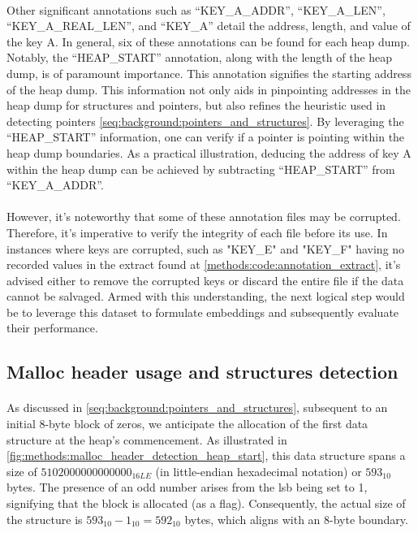         \paragraph{}Other significant annotations such as ``KEY\_A\_ADDR'', ``KEY\_A\_LEN'', ``KEY\_A\_REAL\_LEN'', and ``KEY\_A'' detail the address, length, and value of the key A. In general, six of these annotations can be found for each heap dump. Notably, the ``HEAP\_START'' annotation, along with the length of the heap dump, is of paramount importance. This annotation signifies the starting address of the heap dump. This information not only aids in pinpointing addresses in the heap dump for \glspl{structure} and \glspl{pointer}, but also refines the heuristic used in detecting \glspl{pointer} \ref{seq:background:pointers_and_structures}. By leveraging the ``HEAP\_START'' information, one can verify if a \gls{pointer} is pointing within the heap dump boundaries. As a practical illustration, deducing the address of key A within the heap dump can be achieved by subtracting ``HEAP\_START'' from ``KEY\_A\_ADDR''.

        \paragraph{}However, it's noteworthy that some of these annotation files may be corrupted. Therefore, it's imperative to verify the integrity of each file before its use. In instances where keys are corrupted, such as "KEY\_E" and "KEY\_F" having no recorded values in the extract found at \ref{methods:code:annotation_extract}, it's advised either to remove the corrupted keys or discard the entire file if the data cannot be salvaged. Armed with this understanding, the next logical step would be to leverage this dataset to formulate embeddings and subsequently evaluate their performance.

    \subsection{Malloc header usage and structures detection}
        \paragraph{}As discussed in \ref{seq:background:pointers_and_structures}, subsequent to an initial 8-byte block of zeros, we anticipate the allocation of the first data structure at the heap's commencement. As illustrated in \ref{fig:methods:malloc_header_detection_heap_start}, this data structure spans a size of $ 5102000000000000_{16LE} $ (in little-endian hexadecimal notation) or $ 593_{10} $ bytes. The presence of an odd number arises from the \acrshort{lsb} being set to 1, signifying that the block is allocated (as a flag). Consequently, the actual size of the structure is $ 593_{10} - 1_{10} = 592_{10} $ bytes, which aligns with an 8-byte boundary.

